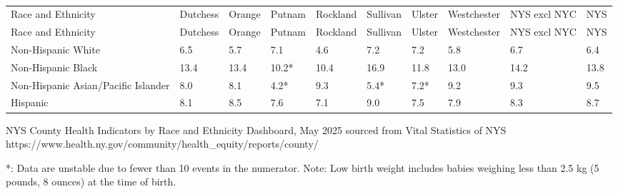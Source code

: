 \documentclass[
  english,
  letterpaper,
]{report}
\begin{document}
\begin{longtable}[]{@{}llllllllll@{}}

\caption{\label{tbl-lbw-rande-percent}Percentage of Low Birthweight
Infants by Race and Ethnicity, 2020--2022}

\tabularnewline

\caption{}\label{T_a96f4}\tabularnewline
\toprule\noalign{}
Race and Ethnicity & Dutchess & Orange & Putnam & Rockland & Sullivan &
Ulster & Westchester & NYS excl NYC & NYS \\
\midrule\noalign{}
\endfirsthead
\toprule\noalign{}
Race and Ethnicity & Dutchess & Orange & Putnam & Rockland & Sullivan &
Ulster & Westchester & NYS excl NYC & NYS \\
\midrule\noalign{}
\endhead
\bottomrule\noalign{}
\endlastfoot
Non-Hispanic White & 6.5 & 5.7 & 7.1 & 4.6 & 7.2 & 7.2 & 5.8 & 6.7 &
6.4 \\
Non-Hispanic Black & 13.4 & 13.4 & 10.2* & 10.4 & 16.9 & 11.8 & 13.0 &
14.2 & 13.8 \\
Non-Hispanic Asian/Pacific Islander & 8.0 & 8.1 & 4.2* & 9.3 & 5.4* &
7.2* & 9.2 & 9.3 & 9.5 \\
Hispanic & 8.1 & 8.5 & 7.6 & 7.1 & 9.0 & 7.5 & 7.9 & 8.3 & 8.7 \\

\end{longtable}

\begin{tcolorbox}[enhanced jigsaw, breakable, leftrule=.75mm, title=\textcolor{quarto-callout-note-color}{\faInfo}\hspace{0.5em}{Source}, bottomrule=.15mm, opacityback=0, left=2mm, colback=white, bottomtitle=1mm, coltitle=black, colbacktitle=quarto-callout-note-color!10!white, colframe=quarto-callout-note-color-frame, opacitybacktitle=0.6, toptitle=1mm, titlerule=0mm, arc=.35mm, rightrule=.15mm, toprule=.15mm]

NYS County Health Indicators by Race and Ethnicity Dashboard, May 2025
sourced from Vital Statistics of NYS
https://www.health.ny.gov/community/health\_equity/reports/county/

\end{tcolorbox}

\begin{tcolorbox}[enhanced jigsaw, breakable, leftrule=.75mm, title=\textcolor{quarto-callout-note-color}{\faInfo}\hspace{0.5em}{Note}, bottomrule=.15mm, opacityback=0, left=2mm, colback=white, bottomtitle=1mm, coltitle=black, colbacktitle=quarto-callout-note-color!10!white, colframe=quarto-callout-note-color-frame, opacitybacktitle=0.6, toptitle=1mm, titlerule=0mm, arc=.35mm, rightrule=.15mm, toprule=.15mm]

*: Data are unstable due to fewer than 10 events in the numerator. Note:
Low birth weight includes babies weighing less than 2.5 kg (5 pounds, 8
ounces) at the time of birth.

\end{tcolorbox}
\end{document}
